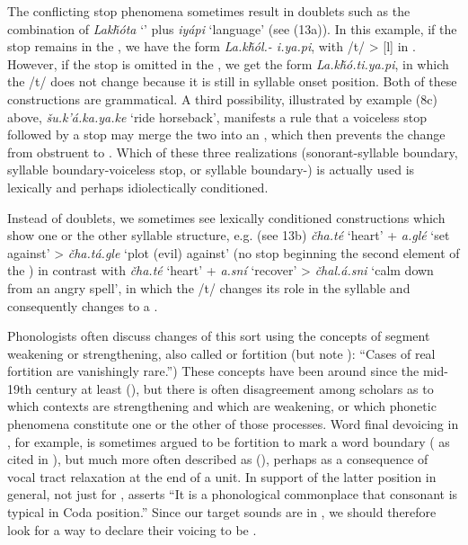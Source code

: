 \documentclass[output=paper]{LSP/langsci}
\begin{document}
The conflicting  stop phenomena sometimes result in doublets such as the combination of \textit{Lak\v{h}\'ota} `' plus \textit{iy\'api} `language' (see (13a)). In this example, if the  stop remains in the , we have the form \textit{La.k\v{h}\'ol.- i.ya.pi}, with /t/ > [l] in . However, if the  stop is omitted in the , we get the form \textit{La.k\v{h}\'o.ti.ya.pi}, in which the /t/ does not change because it is still in syllable onset position. Both of these constructions are grammatical. A third possibility, illustrated by example (8c) above, \textit{\v{s}u.k'\'a.ka.ya.ke} `ride horseback', manifests a rule that a voiceless stop followed by a  stop may merge the two into an , which then prevents the change from obstruent to . Which of these three realizations (sonorant-syllable boundary, syllable boundary-voiceless stop, or syllable boundary-) is actually used is lexically and perhaps idiolectically conditioned.

Instead of doublets, we sometimes see lexically conditioned constructions which show one or the other syllable structure, e.g. (see 13b) \textit{\v{c}ha.t\'e} `heart' + \textit{a.gl\'e} `set against' > \textit{\v{c}ha.t\'a.gle} `plot (evil) against' (no  stop beginning the second element of the ) in contrast with \textit{\v{c}ha.t\'e} `heart' + \textit{a.sn\'i} `recover' > \textit{\v{c}hal.\'a.sni} `calm down from an angry spell', in which the /t/ changes its role in the syllable and consequently changes to a .

Phonologists often discuss changes of this sort using the concepts of segment weakening or strengthening, also called  or fortition (but note \citealt[10]{Honeybone2008}): ``Cases of real fortition are vanishingly rare.'') These concepts have been around since the mid-19th century at least (\citealt{Honeybone2008}), but there is often disagreement among scholars as to which contexts are strengthening and which are weakening, or which phonetic phenomena constitute one or the other of those processes. Word final devoicing in , for example, is sometimes argued to be fortition to mark a word boundary (\citealt{IversonSalmons2007} as cited in \citealt{Harris2009}), but much more often described as  (\citealt{Harris2009}), perhaps as a consequence of vocal tract relaxation at the end of a unit. In support of the latter position in general, not just for , \citet[112]{Szigetvari2008} asserts ``It is a phonological commonplace that consonant  is typical in Coda position.'' Since our target sounds are in , we should therefore look for a way to declare their voicing to be .
\end{document}

